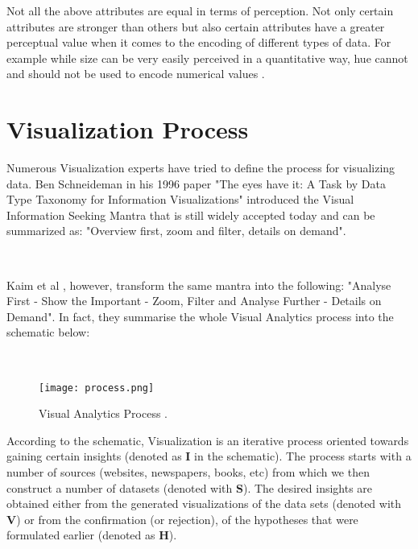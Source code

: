 \documentclass[16pt]{extreport}
\begin{document}
Not all the above attributes are equal in terms of perception. Not only certain attributes are stronger than others but also certain attributes have a greater perceptual value when it comes to the encoding of different types of data. For example while size can be very easily perceived in a quantitative way, hue cannot and should not be used to encode numerical values \cite{few1}. 

\clearpage


\section{Visualization Process} 

\parbox{\linewidth}{
\justify
\large{
Numerous Visualization experts have tried to define the process for visualizing data. Ben Schneideman in his 1996 paper "The eyes have it: A Task by Data Type Taxonomy for Information Visualizations" \cite{schneideman} introduced the Visual Information Seeking Mantra that is still widely accepted today and can be summarized as: "Overview first, zoom and filter, details on demand".}}
\hfill \break \\



\parbox{\linewidth}{
\justify
\large{
Kaim et al \cite{kaim}, however, transform the same mantra into the following: "Analyse First - Show the Important - Zoom, Filter and Analyse Further - Details on Demand". In fact, they summarise the whole Visual Analytics process into the schematic below:}}
\hfill \break \\

\begin{center}
	\begin{figure}[h]
		\texttt{[image: process.png]}
		\caption[]{Visual Analytics Process \footnotemark .}
	\end{figure}
\end{center}

\parbox{\linewidth}{
\justify
\large{According to the schematic, Visualization is an iterative process oriented towards gaining certain insights (denoted as \textbf{I} in the schematic). The process starts with a number of sources (websites, newspapers, books, etc) from which we then construct a number of datasets (denoted with \textbf{S}). The desired insights are obtained either from the generated visualizations of the data sets (denoted with \textbf{V}) or from the confirmation (or rejection), of the hypotheses that were formulated earlier (denoted as \textbf{H}).}}
\hfill \break\\
\end{document}
